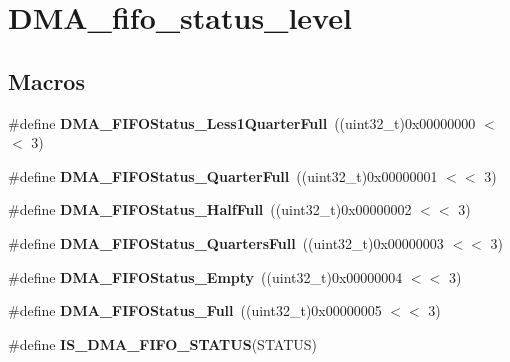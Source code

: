 \hypertarget{group___d_m_a__fifo__status__level}{\section{D\-M\-A\-\_\-fifo\-\_\-status\-\_\-level}
\label{group___d_m_a__fifo__status__level}
}
\subsection*{Macros}
\begin{DoxyCompactItemize}
\item 
\hypertarget{group___d_m_a__fifo__status__level_gace4b567c96b1c95618a4894875d8123b}{\#define {\bfseries D\-M\-A\-\_\-\-F\-I\-F\-O\-Status\-\_\-\-Less1\-Quarter\-Full}~((uint32\-\_\-t)0x00000000 $<$$<$ 3)}\label{group___d_m_a__fifo__status__level_gace4b567c96b1c95618a4894875d8123b}

\item 
\hypertarget{group___d_m_a__fifo__status__level_ga258d41ce51005eea1c5a69fcf07d8e42}{\#define {\bfseries D\-M\-A\-\_\-\-F\-I\-F\-O\-Status\-\_\-Quarter\-Full}~((uint32\-\_\-t)0x00000001 $<$$<$ 3)}\label{group___d_m_a__fifo__status__level_ga258d41ce51005eea1c5a69fcf07d8e42}

\item 
\hypertarget{group___d_m_a__fifo__status__level_ga0dd0faeb4ac9de3dbdcd7ca6dd5bb9e4}{\#define {\bfseries D\-M\-A\-\_\-\-F\-I\-F\-O\-Status\-\_\-\-Half\-Full}~((uint32\-\_\-t)0x00000002 $<$$<$ 3)}\label{group___d_m_a__fifo__status__level_ga0dd0faeb4ac9de3dbdcd7ca6dd5bb9e4}

\item 
\hypertarget{group___d_m_a__fifo__status__level_ga418c64b77f903c558471d22eeabde439}{\#define {\bfseries D\-M\-A\-\_\-\-F\-I\-F\-O\-Status\-\_\-Quarters\-Full}~((uint32\-\_\-t)0x00000003 $<$$<$ 3)}\label{group___d_m_a__fifo__status__level_ga418c64b77f903c558471d22eeabde439}

\item 
\hypertarget{group___d_m_a__fifo__status__level_gaacba9ad22e39ed92d2b4ae9ebece654c}{\#define {\bfseries D\-M\-A\-\_\-\-F\-I\-F\-O\-Status\-\_\-\-Empty}~((uint32\-\_\-t)0x00000004 $<$$<$ 3)}\label{group___d_m_a__fifo__status__level_gaacba9ad22e39ed92d2b4ae9ebece654c}

\item 
\hypertarget{group___d_m_a__fifo__status__level_gaf7ea7373a08730e773cbc048c9965dc2}{\#define {\bfseries D\-M\-A\-\_\-\-F\-I\-F\-O\-Status\-\_\-\-Full}~((uint32\-\_\-t)0x00000005 $<$$<$ 3)}\label{group___d_m_a__fifo__status__level_gaf7ea7373a08730e773cbc048c9965dc2}

\item 
\#define {\bfseries I\-S\-\_\-\-D\-M\-A\-\_\-\-F\-I\-F\-O\-\_\-\-S\-T\-A\-T\-U\-S}(S\-T\-A\-T\-U\-S)
\end{DoxyCompactItemize}


